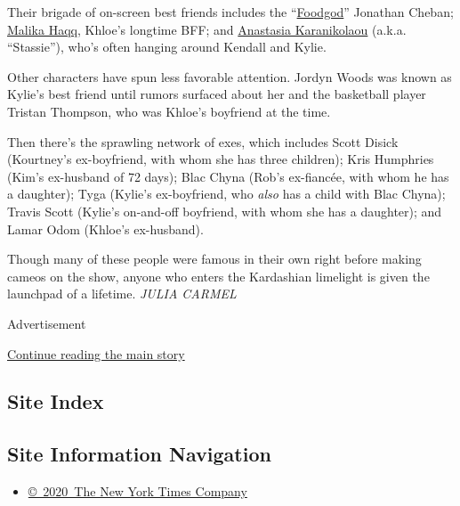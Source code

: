 Their brigade of on-screen best friends includes the
``\href{https://www.instagram.com/foodgod/?hl=en}{Foodgod}'' Jonathan
Cheban; \href{https://www.instagram.com/malika/?hl=en}{Malika Haqq},
Khloe's longtime BFF; and
\href{https://www.instagram.com/stassiebaby/?hl=en}{Anastasia
Karanikolaou} (a.k.a. ``Stassie''), who's often hanging around Kendall
and Kylie.

Other characters have spun less favorable attention. Jordyn Woods was
known as Kylie's best friend until rumors surfaced about her and the
basketball player Tristan Thompson, who was Khloe's boyfriend at the
time.

Then there's the sprawling network of exes, which includes Scott Disick
(Kourtney's ex-boyfriend, with whom she has three children); Kris
Humphries (Kim's ex-husband of 72 days); Blac Chyna (Rob's ex-fiancée,
with whom he has a daughter); Tyga (Kylie's ex-boyfriend, who
\emph{also} has a child with Blac Chyna); Travis Scott (Kylie's
on-and-off boyfriend, with whom she has a daughter); and Lamar Odom
(Khloe's ex-husband).

Though many of these people were famous in their own right before making
cameos on the show, anyone who enters the Kardashian limelight is given
the launchpad of a lifetime. \emph{JULIA CARMEL}

Advertisement

\protect\hyperlink{after-bottom}{Continue reading the main story}

\hypertarget{site-index}{%
\subsection{Site Index}\label{site-index}}

\hypertarget{site-information-navigation}{%
\subsection{Site Information
Navigation}\label{site-information-navigation}}

\begin{itemize}
\tightlist
\item
  \href{https://help.nytimes3xbfgragh.onion/hc/en-us/articles/115014792127-Copyright-notice}{©~2020~The
  New York Times Company}
\end{itemize}


